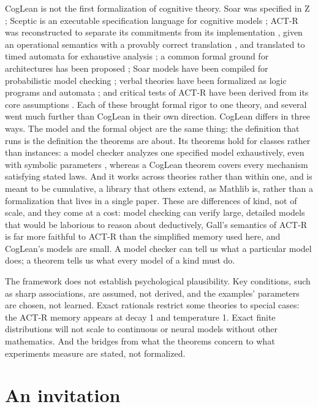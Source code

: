 \documentclass[11pt]{article}
\begin{document}
CogLean is not the first formalization of cognitive theory. Soar was
specified in Z \citep{milnes1992}; Sceptic is an executable
specification language for cognitive models \citep{cooper1996}; ACT-R
was reconstructed to separate its commitments from its implementation
\citep{stewart2007}, given an operational semantics with a provably
correct translation \citep{gall2018,gall2017confluence}, and
translated to timed automata for exhaustive analysis
\citep{langenfeld2019,langenfeld2021}; a common formal ground for
architectures has been proposed \citep{ragni2018}; Soar models have
been compiled for probabilistic model checking
\citep{ganeriwala2026,kwiatkowska2011}; verbal theories have been
formalized as logic programs and automata \citep{rohner2021,finkel2025};
and critical tests of ACT-R have been derived from its core
assumptions \citep{fisher2025}. Each of these brought formal rigor to
one theory, and several went much further than CogLean in their own
direction. CogLean differs in three ways. The model and the formal
object are the same thing: the definition that runs is the definition
the theorems are about. Its theorems hold for classes rather than
instances: a model checker analyzes one specified model exhaustively,
even with symbolic parameters \citep{hahn2011}, whereas a CogLean
theorem covers every mechanism satisfying stated laws. And it works
across theories rather than within one, and is meant to be cumulative,
a library that others extend, as Mathlib is, rather than a
formalization that lives in a single paper. These are differences of
kind, not of scale, and they come at a cost: model checking can verify
large, detailed models that would be laborious to reason about
deductively, Gall's semantics of ACT-R is far more faithful to ACT-R
than the simplified memory used here, and CogLean's models are small.
A model checker can tell us what a particular model does; a theorem
tells us what every model of a kind must do.

The framework does not establish psychological plausibility. Key
conditions, such as sharp associations, are assumed, not derived, and
the examples' parameters are chosen, not learned. Exact rationals
restrict some theories to special cases: the ACT-R memory appears at
decay 1 and temperature 1. Exact finite distributions will not scale
to continuous or neural models without other mathematics. And the
bridges from what the theorems concern to what experiments measure are
stated, not formalized.

\section{An invitation}
\label{sec:invite}
\end{document}
